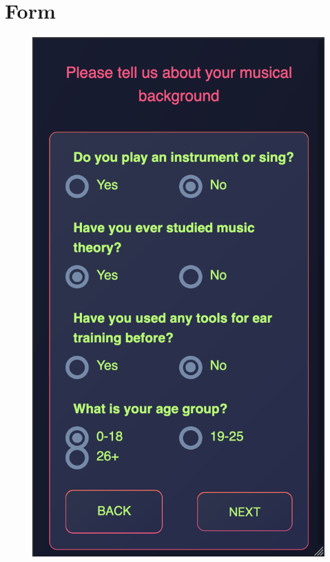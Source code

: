 \section{Form}
\begin{figure}[H]
\centering
\includegraphics[scale=.33]{Parts/Fig/form.png}
\vspace*{-5mm}
\end{figure}


